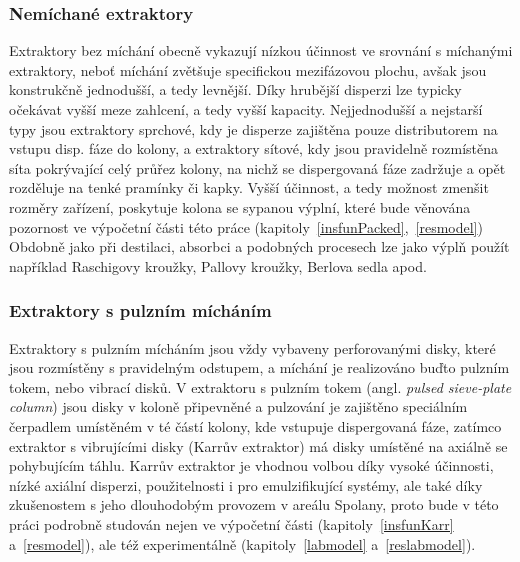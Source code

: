 \subsubsection{Nemíchané extraktory} \label{extractionPacked}
Extraktory bez míchání obecně vykazují nízkou účinnost ve srovnání s míchanými extraktory, neboť míchání zvětšuje specifickou mezifázovou plochu, avšak jsou konstrukčně jednodušší, a tedy levnější.
Díky hrubější disperzi lze typicky očekávat vyšší meze zahlcení, a tedy vyšší kapacity.
Nejjednodušší a nejstarší typy jsou extraktory sprchové, kdy je disperze zajištěna pouze distributorem na vstupu disp. fáze do kolony, a extraktory sítové, kdy jsou pravidelně rozmístěna síta pokrývající celý průřez kolony, na nichž se dispergovaná fáze zadržuje a opět rozděluje na tenké pramínky či kapky.
Vyšší účinnost, a tedy možnost zmenšit rozměry zařízení, poskytuje kolona se sypanou výplní, které bude věnována pozornost ve výpočetní části této práce (kapitoly~\ref{insfunPacked},~\ref{resmodel})
Obdobně jako při destilaci, absorbci a podobných procesech lze jako výplň použít například Raschigovy kroužky, Pallovy kroužky, Berlova sedla apod.

\subsubsection{Extraktory s pulzním mícháním} \label{extractionKarr}
Extraktory s pulzním mícháním jsou vždy vybaveny perforovanými disky, které jsou rozmístěny s pravidelným odstupem, a míchání je realizováno buďto pulzním tokem, nebo vibrací disků.
V extraktoru s pulzním tokem (angl. \textit{pulsed sieve-plate column}) jsou disky v koloně připevněné a pulzování je zajištěno speciálním čerpadlem umístěném v té částí kolony, kde vstupuje dispergovaná fáze, zatímco extraktor s vibrujícími disky (Karrův extraktor) má disky umístěné na axiálně se pohybujícím táhlu.
Karrův extraktor je vhodnou volbou díky vysoké účinnosti, nízké axiální disperzi, použitelnosti i pro emulzifikující systémy, ale také díky zkušenostem s jeho dlouhodobým provozem v areálu Spolany, proto bude v této práci podrobně studován nejen ve výpočetní části (kapitoly~\ref{insfunKarr} a~\ref{resmodel}), ale též experimentálně (kapitoly~\ref{labmodel} a~\ref{reslabmodel}).

